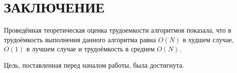 \chapter*{\hfill{\centering ЗАКЛЮЧЕНИЕ}\hfill}

Проведённая теоретическая оценка трудоемкости алгоритмов показала, что в трудоёмкость выполнения данного алгоритма равна $O(N)$ в худшем случае, $O(1)$ в лучшем случае и трудоёмкость в среднем $O(N)$.

Цель, поставленная перед началом работы, была достигнута.